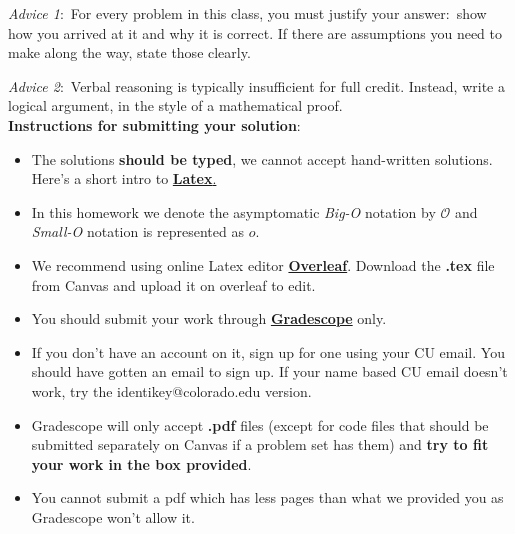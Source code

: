 \documentclass[12pt]{article}
\begin{document}
\renewcommand{\headrulewidth}{0.5pt}

\phantom{Test}

\begin{small}
\textit{Advice 1}:\ For every problem in this class, you must justify your answer:\ show how you arrived at it and why it is correct. If there are assumptions you need to make along the way, state those clearly.

\textit{Advice 2}:\ Verbal reasoning is typically insufficient for full credit. Instead, write a logical argument, in the style of a mathematical proof.\\

\textbf{Instructions for submitting your solution}:
\vspace{-5mm} 

\begin{itemize}
	\item The solutions \textbf{should be typed}, we cannot accept hand-written solutions. Here's a short intro to \href{http://ece.uprm.edu/~caceros/latex/introduction.pdf}{\textbf{Latex}.}
	 \item In this homework we denote the asymptomatic \textit{Big-O} notation by $\mathcal{O}$ and \textit{Small-O} notation is represented as $o$. 
	\item We recommend using online Latex editor \href{https://www.overleaf.com/}{\textbf{Overleaf}}. Download the \textbf{.tex} file from Canvas and upload it on overleaf to edit.
	\item You should submit your work through \href{https://www.gradescope.com}{\textbf{Gradescope}}  only.
	\item If you don't have an account on it, sign up for one using your CU email. You should have gotten an email to sign up. If your name based CU email doesn't work, try the identikey@colorado.edu version. 
	\item Gradescope will only accept \textbf{.pdf} files (except for code files that should be submitted separately on Canvas if a problem set has them) and \textbf{try to fit your work in the box provided}. 
	\item You cannot submit a pdf which has less pages than what we provided you as Gradescope won't allow it.
   
\end{itemize}
\vspace{-4mm} 
\end{small}
\end{document}

